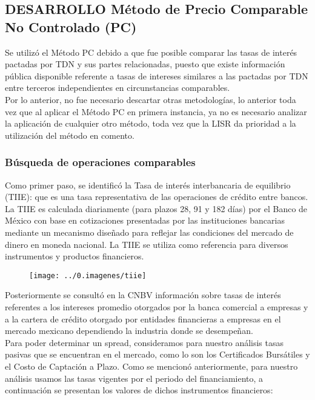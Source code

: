 \subsection{DESARROLLO Método de Precio Comparable No Controlado (PC)}

Se utilizó el Método PC debido a que fue posible comparar las tasas de interés pactadas por TDN y sus partes relacionadas, puesto que existe información pública disponible referente a tasas de intereses similares a las pactadas por TDN entre terceros independientes en circunstancias comparables.\\

Por lo anterior, no fue necesario descartar otras metodologías, lo anterior toda vez que al aplicar el Método PC en primera instancia, ya no es necesario analizar la aplicación de cualquier otro método, toda vez que la LISR da prioridad a la utilización del método en comento.

\subsubsection{Búsqueda de operaciones comparables}

Como primer paso, se identificó  la Tasa de interés interbancaria de equilibrio (TIIE): que es una tasa representativa de las operaciones de crédito entre bancos. La TIIE es calculada diariamente (para plazos 28, 91 y 182 días) por el Banco de México con base en cotizaciones presentadas por las instituciones bancarias mediante un mecanismo diseñado para reflejar las condiciones del mercado de dinero en moneda nacional. La TIIE se utiliza como referencia para diversos instrumentos y productos financieros.

\begin{figure}[H]
\centering
\texttt{[image: ../0.imagenes/tiie]}
\end{figure}

Posteriormente se consultó en la CNBV información sobre tasas de interés referentes a los intereses promedio otorgados por la banca comercial a empresas y a la cartera de crédito otorgado por entidades financieras a empresas en el mercado mexicano dependiendo la industria donde se desempeñan.\\ 

Para poder determinar un spread, consideramos para nuestro análisis tasas pasivas que se encuentran en el mercado, como lo son los Certificados Bursátiles y el Costo de Captación a Plazo. Como se mencionó anteriormente, para nuestro análisis usamos las tasas vigentes por el periodo del financiamiento, a continuación se presentan los valores de dichos instrumentos financieros: \\

